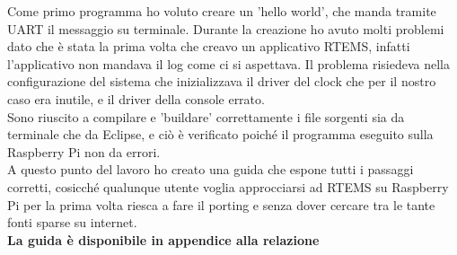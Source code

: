 \documentclass[12pt, a4paper, titlepage, oneside]{book}
\begin{document}
\begin{flushleft}
Come primo programma ho voluto creare un 'hello world', che manda tramite UART il messaggio su terminale. Durante la creazione ho avuto molti problemi dato che è stata la prima volta che creavo un applicativo RTEMS, infatti l'applicativo non mandava il log come ci si aspettava. Il problema risiedeva nella configurazione del sistema che inizializzava il driver del clock che per il nostro caso era inutile, e il driver della console errato.\\
Sono riuscito a compilare e 'buildare' correttamente i file sorgenti sia da terminale che da Eclipse, e ciò è verificato poiché il programma eseguito sulla Raspberry Pi non da errori.\\
A questo punto del lavoro ho creato una guida che espone tutti i passaggi corretti, cosicché qualunque utente voglia approcciarsi ad RTEMS su Raspberry Pi per la prima volta riesca a fare il porting e  senza dover cercare tra le tante fonti sparse su internet.\\
\textbf{La guida è disponibile in appendice alla relazione}

\end{flushleft}
\end{document}

